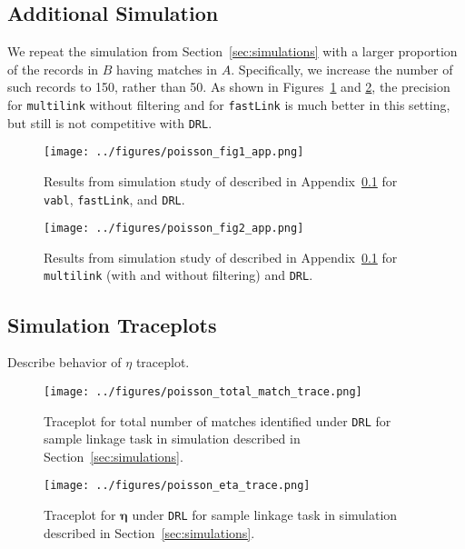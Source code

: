 \documentclass[12pt,letterpaper]{article}
\newcommand{\1}[1]{\mathbb{I}\!\left[#1\right]} %
\begin{document}
\subsection{Additional Simulation}\label{app:simulation-2}

We repeat the simulation from Section~\ref{sec:simulations} with a larger proportion of the records in $B$ having matches in $A$. Specifically, we increase the number of such records to 150, rather than 50. As shown in Figures~\ref{fig:sim-vabl-comparison-2} and \ref{fig:sim-multilink-comparison-2}, the precision for \texttt{multilink} without filtering and for \texttt{fastLink} is much better in this setting, but still is not competitive with \texttt{DRL}. 

\begin{figure}[t]
	\centering
	\texttt{[image: ../figures/poisson\_fig1\_app.png]}
	\caption{Results from simulation study of described in Appendix~\ref{app:simulation-2} for \texttt{vabl}, \texttt{fastLink}, and \texttt{DRL}.}
	\label{fig:sim-vabl-comparison-2}
\end{figure}

\begin{figure}
	\centering
	\texttt{[image: ../figures/poisson\_fig2\_app.png]}
	\caption{Results from simulation study of described in Appendix~\ref{app:simulation-2} for \texttt{multilink} (with and without filtering) and \texttt{DRL}.}
	\label{fig:sim-multilink-comparison-2}
\end{figure}

\subsection{Simulation Traceplots}\label{app:simulation-traceplots}


Describe behavior of $\eta$ traceplot.

\begin{figure}[t]
	\centering
	\texttt{[image: ../figures/poisson\_total\_match\_trace.png]}
	\caption{Traceplot for total number of matches identified under \texttt{DRL} for sample linkage task in simulation described in Section~\ref{sec:simulations}.}
	\label{fig:total-match-traceplot}
\end{figure}

\begin{figure}[t]
	\centering
	\texttt{[image: ../figures/poisson\_eta\_trace.png]}
	\caption{Traceplot for $\bm{\eta}$ under \texttt{DRL} for sample linkage task in simulation described in Section~\ref{sec:simulations}.}
	\label{fig:eta-traceplot}
\end{figure}
\end{document}
